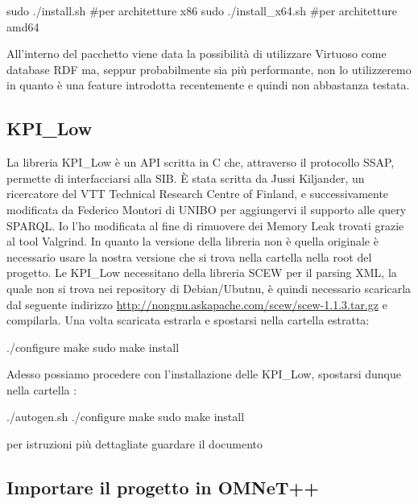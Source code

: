 \begin{bash}
sudo ./install.sh     #per architetture x86
sudo ./install_x64.sh #per architetture amd64
\end{bash}

All'interno del pacchetto viene data la possibilità di utilizzare Virtuoso come database RDF ma, seppur probabilmente sia più performante, non lo utilizzeremo in quanto è una feature introdotta recentemente e quindi non abbastanza testata.

\subsection{KPI_Low}

La libreria KPI_Low è un API scritta in C che, attraverso il protocollo SSAP, permette di interfacciarsi alla SIB. È stata scritta da Jussi Kiljander, un ricercatore del VTT Technical Research Centre of Finland, e successivamente modificata da Federico Montori di UNIBO per aggiungervi il supporto alle query SPARQL. Io l'ho modificata al fine di rimuovere dei Memory Leak trovati grazie al tool Valgrind.
In quanto la versione della libreria non è quella originale è necessario usare la nostra versione che si trova nella cartella  nella root del progetto.
Le KPI_Low necessitano della libreria SCEW per il parsing XML, la quale non si trova nei repository di Debian/Ubutnu,  è quindi necessario scaricarla dal seguente indirizzo \url{http://nongnu.askapache.com/scew/scew-1.1.3.tar.gz} e compilarla. Una volta scaricata estrarla e spostarsi nella cartella estratta:

\begin{bash}
./configure
make
sudo make install
\end{bash}

Adesso possiamo procedere con l'installazione delle KPI_Low, spostarsi dunque nella cartella :

\begin{bash}
./autogen.sh
./configure
make
sudo make install
\end{bash}

per istruzioni più dettagliate guardare il documento 

\subsection{Importare il progetto in OMNeT++}

